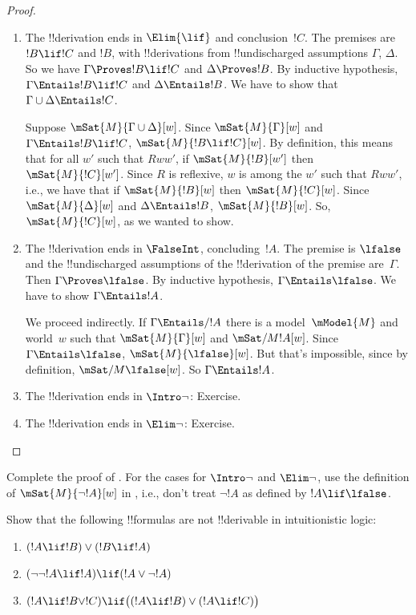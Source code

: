 \documentclass[../../../include/open-logic-section]{subfiles}
\begin{document}
\begin{proof}
\begin{enumerate}
  \item The !!{derivation} ends in $\Elim{\lif}$ and
    conclusion~$!C$. The premises are $!B \lif !C$ and $!B$, with
    !!{derivation}s from !!{undischarged} assumptions $\Gamma$,
    $\Delta$. So we have $\Gamma \Proves !B \lif !C$ and $\Delta
    \Proves !B$. By inductive hypothesis, $\Gamma \Entails !B \lif !C$
    and $\Delta \Entails !B$. We have to show that $\Gamma \cup \Delta
    \Entails !C$.

    Suppose $\mSat{M}{\Gamma \cup \Delta}[w]$. Since
    $\mSat{M}{\Gamma}[w]$ and $\Gamma \Entails !B \lif !C$,
    $\mSat{M}{!B \lif !C}[w]$. By definition, this means that for all
    $w'$ such that $Rww'$, if $\mSat{M}{!B}[w']$ then
    $\mSat{M}{!C}[w']$. Since $R$ is reflexive, $w$ is among the $w'$
    such that $Rww'$, i.e., we have that if $\mSat{M}{!B}[w]$ then
    $\mSat{M}{!C}[w]$. Since $\mSat{M}{\Delta}[w]$ and $\Delta
    \Entails !B$, $\mSat{M}{!B}[w]$. So, $\mSat{M}{!C}[w]$, as we
    wanted to show.

  \item The !!{derivation} ends in $\FalseInt$, concluding~$!A$. The
    premise is $\lfalse$ and the !!{undischarged} assumptions of the
    !!{derivation} of the premise are~$\Gamma$. Then $\Gamma \Proves
    \lfalse$. By inductive hypothesis, $\Gamma \Entails \lfalse$. We
    have to show $\Gamma \Entails !A$.

    We proceed indirectly. If $\Gamma \Entails/ !A$ there is a
    model~$\mModel{M}$ and world~$w$ such that $\mSat{M}{\Gamma}[w]$
    and $\mSat/{M}{!A}[w]$.  Since $\Gamma \Entails \lfalse$,
    $\mSat{M}{\lfalse}[w]$. But that's impossible, since by
    definition, $\mSat/{M}{\lfalse}[w]$. So $\Gamma \Entails !A$.
  \item The !!{derivation} ends in $\Intro\lnot$: Exercise.
  \item The !!{derivation} ends in $\Elim\lnot$: Exercise.
  \end{enumerate}
\end{proof}

\begin{prob}
  Complete the proof of . For the
  cases for $\Intro\lnot$ and $\Elim\lnot$, use the definition of
  $\mSat{M}{\lnot !A}[w]$ in , i.e.,
  don't treat $\lnot !A$ as defined by $!A \lif \lfalse$.
\end{prob}

\begin{prob}
  Show that the following !!{formula}s are not !!{derivable} in
  intuitionistic logic:
  \begin{enumerate}
    \item $(!A \lif !B) \lor (!B \lif !A)$
    \item $(\lnot\lnot !A \lif !A) \lif (!A \lor \lnot !A)$
    \item $(!A \lif !B \lor !C) \lif \bigl((!A \lif !B)\lor(!A \lif !C)\bigr)$
  \end{enumerate}
\end{prob}
\end{document}
